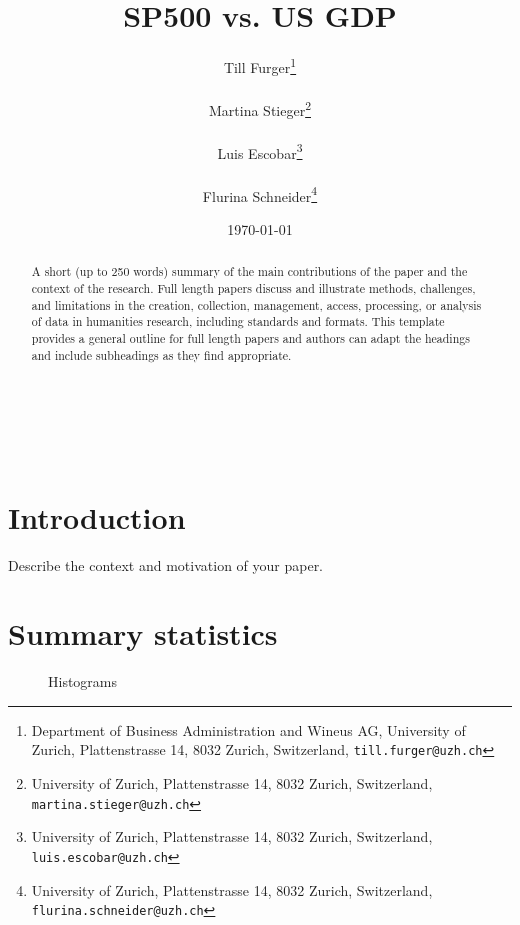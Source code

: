 \documentclass{article}
\title{SP500 vs. US GDP}
\author{
    Till Furger\thanks{Department of Business Administration and Wineus AG, University of Zurich, Plattenstrasse 14, 8032 Zurich, Switzerland, \tt{till.furger@uzh.ch}} \rule{0.5in}{0pt}
    
    Martina Stieger\thanks{University of Zurich, Plattenstrasse 14, 8032 Zurich, Switzerland, \tt{martina.stieger@uzh.ch}} \rule{0.5in}{0pt}
    
    Luis Escobar\thanks{University of Zurich, Plattenstrasse 14, 8032 Zurich, Switzerland, \tt{luis.escobar@uzh.ch}} \rule{0.5in}{0pt}
    
    Flurina Schneider\thanks{University of Zurich, Plattenstrasse 14, 8032 Zurich, Switzerland, \tt{flurina.schneider@uzh.ch}}\\
    
    \small \date{\today}
}
\begin{document}

\maketitle

\begin{abstract} 
\noindent A short (up to 250 words) summary of the main contributions of the paper and the context of the research. Full length papers discuss and illustrate methods, challenges, and limitations in the creation, collection, management, access, processing, or analysis of data in humanities research, including standards and formats. This template provides a general outline for full length papers and authors can adapt the headings and include subheadings as they find appropriate.
\end{abstract}

\hfill

\noindent{}\\
\noindent{}\\

\newpage


\tableofcontents

\section{Introduction}
Describe the context and motivation of your paper.

\section{Summary statistics}

\begin{figure}[htbp]
	\centering
	
	\caption{Histograms}
\end{figure}
\end{document}
